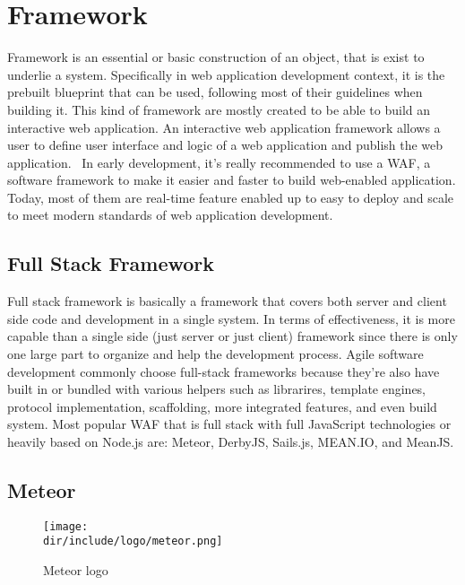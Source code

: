 \section{Framework}
\label{sec:framework}

Framework is an essential or basic construction of an object, that is exist to underlie a system.
Specifically in web application development context, it is the prebuilt blueprint that can be used, following most of their guidelines when building it.
This kind of framework are mostly created to be able to build an interactive web application.
An interactive web application framework allows a user to define user interface and logic of a web application and publish the web application.~\autocite{Addala:2013:InteractiveWebAppFramework}
In early development, it's really recommended to use a \ac{WAF}, a software framework to make it easier and faster to build web-enabled application.
Today, most of them are real-time feature enabled up to easy to deploy and scale to meet modern standards of web application development.

\subsection{Full Stack Framework}
\label{ssec:fullstack-framework}

Full stack framework is basically a framework that covers both server and client side code and development in a single system.
In terms of effectiveness, it is more capable than a single side (just server or just client) framework since there is only one large part to organize and help the development process.
Agile software development commonly choose full-stack frameworks because they're also have built in or bundled with various helpers such as librarires, template engines, protocol implementation, scaffolding, more integrated features, and even build system.
Most popular \ac{WAF} that is full stack with full JavaScript technologies or heavily based on Node.js are: Meteor, DerbyJS, Sails.js, MEAN.IO, and MeanJS.

\subsection{Meteor}
\label{ssec:meteor}

\begin{wrapfigure}{r}{0.5\textwidth}
  \vspace{-20pt}
  \begin{center}
    \texttt{[image: \\dir/include/logo/meteor.png]}
  \end{center}
  \vspace{-20pt}
  \caption{Meteor logo}
  \label{fig:meteor-logo}
  \vspace{-10pt}
\end{wrapfigure}

